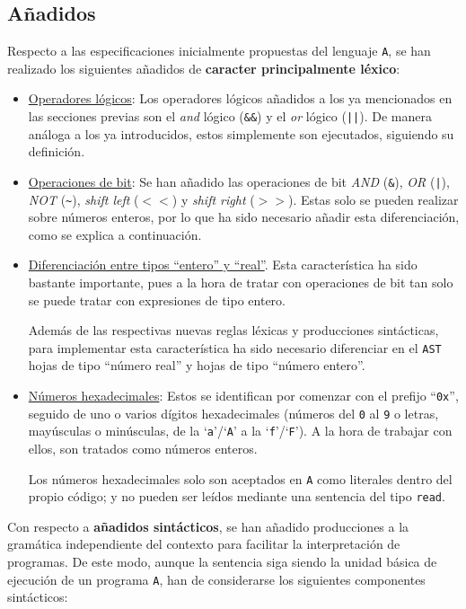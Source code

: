 \documentclass[12pt]{article}
\begin{document}
\subsection{Añadidos}
Respecto a las especificaciones inicialmente propuestas del lenguaje \texttt{A}, se han realizado los siguientes añadidos de \textbf{caracter principalmente léxico}:
\begin{itemize}
    \item \underline{Operadores lógicos}: Los operadores lógicos añadidos a los ya mencionados en las secciones previas son el \textit{and} lógico (\texttt{\&\&}) y el \textit{or} lógico (\texttt{||}). De manera análoga a los ya introducidos, estos simplemente son ejecutados, siguiendo su definición.
    \item \underline{Operaciones de bit}: Se han añadido las operaciones de bit \textit{AND} (\texttt{\&}), \textit{OR} (\texttt{|}), \textit{NOT} (\texttt{\~{}}), \textit{shift left} ($<<$) y \textit{shift right} ($>>$). Estas solo se pueden realizar sobre números enteros, por lo que ha sido necesario añadir esta diferenciación, como se explica a continuación.
    \item \underline{Diferenciación entre tipos ``entero'' y ``real''}. Esta característica ha sido bastante importante, pues a la hora de tratar con operaciones de bit tan solo se puede tratar con expresiones de tipo entero.\par Además de las respectivas nuevas reglas léxicas y producciones sintácticas, para implementar esta característica ha sido necesario diferenciar en el \texttt{AST} hojas de tipo ``número real'' y hojas de tipo ``número entero''.
    \item \underline{Números hexadecimales}: Estos se identifican por comenzar con el prefijo ``\texttt{0x}'', seguido de uno o varios dígitos hexadecimales (números del \texttt{0} al \texttt{9} o letras, mayúsculas o minúsculas, de la `\texttt{a}'/`\texttt{A}' a la `\texttt{f}'/`\texttt{F}'). A la hora de trabajar con ellos, son tratados como números enteros.\par
    Los números hexadecimales solo son aceptados en \texttt{A} como literales dentro del propio código; y no pueden ser leídos mediante una sentencia del tipo \texttt{read}.
\end{itemize}\par
Con respecto a \textbf{añadidos sintácticos}, se han añadido producciones a la gramática independiente del contexto para facilitar la interpretación de programas. De este modo, aunque la sentencia siga siendo la unidad básica de ejecución de un programa \texttt{A}, han de considerarse los siguientes componentes sintácticos:
\end{document}
